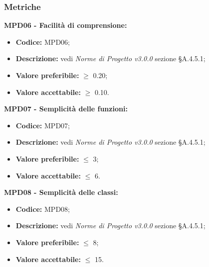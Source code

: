 \subsubsection{Metriche}
\textbf{MPD06 - Facilità di comprensione:}
\begin{itemize}
    \item \textbf{Codice:} MPD06;
    \item \textbf{Descrizione:} vedi \textit{Norme di Progetto v3.0.0} sezione \S A.4.5.1;
    \item \textbf{Valore preferibile:} $\geq$ 0.20;
    \item \textbf{Valore accettabile:} $\geq$ 0.10.
\end{itemize}
\textbf{MPD07 - Semplicità delle funzioni:}
\begin{itemize}
    \item \textbf{Codice:} MPD07;
    \item \textbf{Descrizione:} vedi \textit{Norme di Progetto v3.0.0} sezione \S A.4.5.1;
    \item \textbf{Valore preferibile:} $\leq$ 3;
    \item \textbf{Valore accettabile:} $\leq$ 6.
\end{itemize}
\textbf{MPD08 - Semplicità delle classi:}
\begin{itemize}
    \item \textbf{Codice:} MPD08;
    \item \textbf{Descrizione:} vedi \textit{Norme di Progetto v3.0.0} sezione \S A.4.5.1;
    \item \textbf{Valore preferibile:} $\leq$ 8;
    \item \textbf{Valore accettabile:} $\leq$ 15.
\end{itemize}
